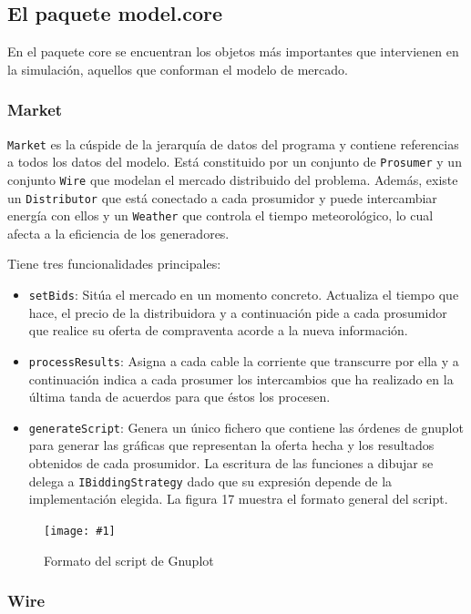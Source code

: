 \documentclass[12pt,a4paper,openright,oneside]{article}
\newcommand{\includeImage}[3]
{
	\begin{figure}[H]
	\begin{center}
	\texttt{[image: \#1]}
	\end{center}
	\caption{#3}
	\end{figure}
}
\numberwithin{equation}{section}
\theoremstyle{definition}
\begin{document}
\subsection{El paquete model.core}
En el paquete core se encuentran los objetos más importantes que intervienen en la simulación, aquellos que conforman el modelo de mercado.
\subsubsection{Market}

\texttt{Market} es la cúspide de la jerarquía de datos del programa y contiene referencias a todos los datos del modelo. Está constituido por un conjunto de \texttt{Prosumer} y un conjunto \texttt{Wire} que modelan el mercado distribuido del problema. Además, existe un \texttt{Distributor} que está conectado a cada prosumidor y puede intercambiar energía con ellos y un \texttt{Weather} que controla el tiempo meteorológico, lo cual afecta a la eficiencia de los generadores.

Tiene tres funcionalidades principales:
\begin{itemize}
\item \texttt{setBids}: Sitúa el mercado en un momento concreto. Actualiza el tiempo que hace, el precio de la distribuidora y a continuación pide a cada prosumidor que realice su oferta de compraventa acorde a la nueva información.

\item \texttt{processResults}: Asigna a cada cable la corriente que transcurre por ella y a continuación indica a cada prosumer los intercambios que ha realizado en la última tanda de acuerdos para que éstos los procesen.

\item \texttt{generateScript}: Genera un único fichero que contiene las órdenes de gnuplot para generar las gráficas que representan la oferta hecha y los resultados obtenidos de cada prosumidor. La escritura de las funciones a dibujar se delega a \texttt{IBiddingStrategy} dado que su expresión depende de la implementación elegida. La figura 17 muestra el formato general del script.

\end{itemize}

\includeImage{formato_script.png}{7}{Formato del script de Gnuplot}

\subsubsection{Wire}
\end{document}
